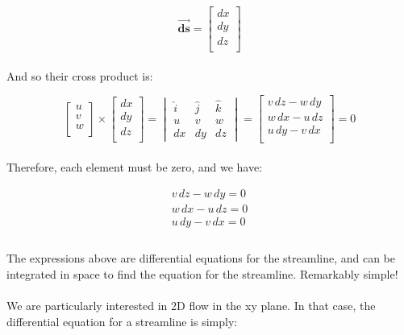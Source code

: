 \documentclass[11pt]{article}
\begin{document}
\begin{equation*}
    \vec{\bm{ds}} =  \begin{bmatrix}
        dx \\
        dy \\
        dz \\     
        \end{bmatrix}
\end{equation*} \\ 
\noindent
And so their cross product is:

\begin{equation*}
    \begin{bmatrix}
        u \\
        v \\
        w \\     
    \end{bmatrix} \times \begin{bmatrix}
            dx \\
            dy \\
            dz \\     
    \end{bmatrix} = \begin{vmatrix}
        \hat{i} & \hat{j} & \hat{k} \\
        u & v & w \\
        dx & dy & dz
    \end{vmatrix} = \begin{bmatrix}
        v\,dz - w\,dy \\
        w\,dx - u\,dz \\
        u\,dy - v\,dx \\     
        \end{bmatrix} = 0
\end{equation*} \\ 
\noindent
Therefore, each element must be zero, and we have:

\begin{equation*}
    \begin{matrix}
        v\,dz - w\,dy = 0\\
        w\,dx - u\,dz = 0\\
        u\,dy - v\,dx = 0\\ 
    \end{matrix}
\end{equation*}\\
\noindent
The expressions above are differential equations for the streamline, and can be integrated in space to find the equation for the streamline. Remarkably simple! \\ \\
\noindent
We are particularly interested in 2D flow in the xy plane. In that case, the differential equation for a streamline is simply:
\end{document}
